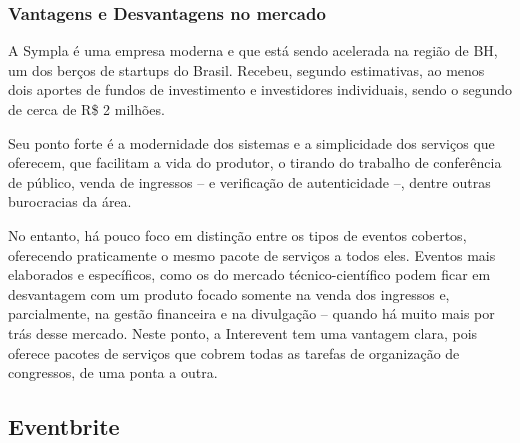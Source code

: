 \documentclass[12pt,a4paper,twoside,hyphens,english,brazil]{abntex2}
\begin{document}
\subsubsection*{Vantagens e Desvantagens no mercado}
A Sympla é uma empresa moderna e que está sendo acelerada na região de BH, um dos berços de startups do Brasil. Recebeu, segundo estimativas, ao menos dois aportes de fundos de investimento e investidores individuais, sendo o segundo de cerca de R\$ 2 milhões.\cite{sympla-aporte}

Seu ponto forte é a modernidade dos sistemas e a simplicidade dos serviços que oferecem, que facilitam a vida do produtor, o tirando do trabalho de conferência de público, venda de ingressos -- e verificação de autenticidade --, dentre outras burocracias da área.

No entanto, há pouco foco em distinção entre os tipos de eventos cobertos, oferecendo praticamente o mesmo pacote de serviços a todos eles. Eventos mais elaborados e específicos, como os do mercado técnico-científico podem ficar em desvantagem com um produto focado somente na venda dos ingressos e, parcialmente, na gestão financeira e na divulgação -- quando há muito mais por trás desse mercado. Neste ponto, a Interevent tem uma vantagem clara, pois oferece pacotes de serviços que cobrem todas as tarefas de organização de congressos, de uma ponta a outra.

\subsection{Eventbrite}
\end{document}
